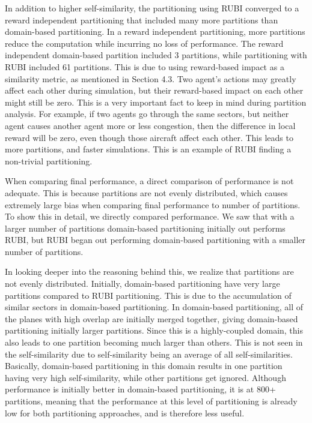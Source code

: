 \documentclass[letterpaper]{article}
\begin{document}
In addition to higher self-similarity, the partitioning using RUBI converged to a reward independent partitioning that included many more partitions than domain-based partitioning. In a reward independent partitioning, more partitions reduce the computation while incurring no loss of performance. The reward independent domain-based partition included 3 partitions, while partitioning with RUBI included 61 partitions. This is due to using reward-based impact as a similarity metric, as mentioned in Section 4.3. Two agent's actions may greatly affect each other during simulation, but their reward-based impact on each other might still be zero. This is a very important fact to keep in mind during partition analysis. For example, if two agents go through the same sectors, but neither agent causes another agent more or less congestion, then the difference in local reward will be zero, even though those aircraft affect each other. This leads to more partitions, and faster simulations. This is an example of RUBI finding a non-trivial partitioning.

When comparing final performance, a direct comparison of performance is not adequate. This is because partitions are not evenly distributed, which causes extremely large bias when comparing final performance to number of partitions. To show this in detail, we directly compared performance. We saw that with a larger number of partitions domain-based partitioning initially out performs RUBI, but RUBI began out performing domain-based partitioning with a smaller number of partitions. 

In looking deeper into the reasoning behind this, we realize that partitions are not evenly distributed. Initially, domain-based partitioning have very large partitions compared to RUBI partitioning. This is due to the accumulation of similar sectors in domain-based partitioning. In domain-based partitioning, all of the planes with high overlap are initially merged together, giving domain-based partitioning initially larger partitions. Since this is a highly-coupled domain, this also leads to one partition becoming much larger than others. This is not seen in the self-similarity due to self-similarity being an average of all self-similarities. Basically, domain-based partitioning in this domain results in one partition having very high self-similarity, while other partitions get ignored. Although performance is initially better in domain-based partitioning, it is at 800+ partitions, meaning that the performance at this level of partitioning is already low for both partitioning approaches, and is therefore less useful.
\end{document}
